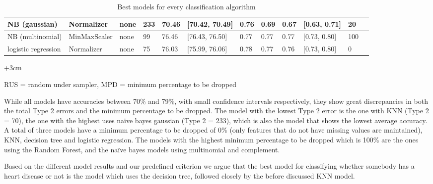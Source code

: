 \begin{table}[]
\begin{adjustwidth}{-3cm}{}
\begin{footnotesize}
\begin{tabular}{|l|l|l|l|l|l|l|l|l|l|l|l|}
NB (gaussian)             & Normalizer           & none               & 233             & 70.46         & {[}70.42, 70.49{]}   & 0.76           & 0.69        & 0.67         & {[}0.63, 0.71{]}     & 20                                                   \\ \hline
NB (multinomial)          & MinMaxScaler         & none               & 99              & 76.46         & {[}76.43, 76.50{]}   & 0.77           & 0.77        & 0.77         & {[}0.73, 0.80{]}     & 100                                                  \\ \hline
logistic regression                & Normalizer           & none               & 75              & 76.03         & {[}75.99, 76.06{]}   & 0.78           & 0.77         & 0.76         & {[}0.73, 0.80{]}     & 0                                                    \\ \hline
\end{tabular}

\begin{adjustwidth}{+3cm}{}
\begin{center}
\centering
RUS = random under sampler, MPD = minimum percentage to be dropped
\end{center}
\end{adjustwidth}
\end{footnotesize}
\caption{Best models for every classification algorithm} 
\label{table:modelresults}
	
\end{adjustwidth}
\end{table}

While all models have accuracies between 70\% and 79\%, with small confidence intervals respectively, they show great discrepancies in both the total Type 2 errors and the minimum percentage to be dropped. The model with the lowest Type 2 error is the one with KNN (Type 2 = 70), the one with the highest uses naïve bayes gaussian (Type 2 = 233), which is also the model that shows the lowest average accuracy. A total of three models have a minimum percentage to be dropped of 0\% (only features that do not have missing values are maintained), KNN, decision tree and logistic regression. The models with the highest minimum percentage to be dropped which is 100\% are the ones using the Random Forest, and the naïve bayes models using multinomial and complement. 

Based on the different model results and our predefined criterion we argue that the best model for classifying whether somebody has a heart disease or not is the model which uses the decision tree, followed closely by the before discussed KNN model.

